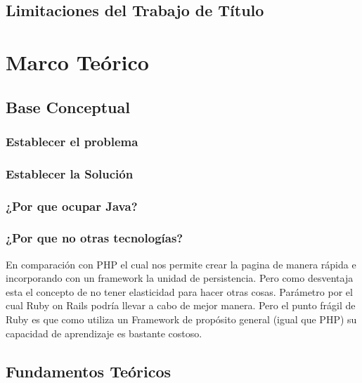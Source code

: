 \documentclass[a4paper,12pt,openany,oneside]{book}
\begin{document}
\section{Limitaciones del Trabajo de Título}

\chapter{Marco Teórico}
\thispagestyle{empty}
\section{Base Conceptual}
\subsection{Establecer el problema}

\subsection{Establecer la Solución}

\subsection{¿Por que ocupar Java?}

\subsection{¿Por que no otras tecnologías?}
En comparación con PHP el cual nos permite crear la pagina de manera rápida e incorporando con un framework la unidad de persistencia. Pero como desventaja esta el concepto de no tener elasticidad para hacer otras cosas. Parámetro por el cual Ruby on Rails podría llevar a cabo de mejor manera. Pero el punto frágil de Ruby es que como utiliza un Framework de propósito general (igual que PHP) su capacidad de aprendizaje es bastante costoso. 
\section{Fundamentos Teóricos}
\end{document}
